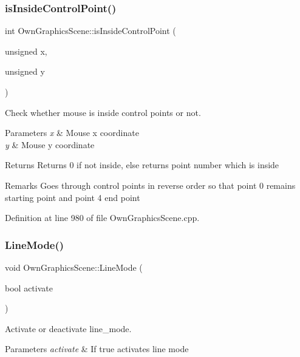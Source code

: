 \subsubsection{\texorpdfstring{is\+Inside\+Control\+Point()}{isInsideControlPoint()}}
{\footnotesize\ttfamily int Own\+Graphics\+Scene\+::is\+Inside\+Control\+Point (\begin{DoxyParamCaption}\item[{unsigned}]{x,  }\item[{unsigned}]{y }\end{DoxyParamCaption})}



Check whether mouse is inside control points or not. 


\begin{DoxyParams}{Parameters}
{\em x} & Mouse x coordinate \\
\hline
{\em y} & Mouse y coordinate \\
\hline
\end{DoxyParams}
\begin{DoxyReturn}{Returns}
Returns 0 if not inside, else returns point number which is inside 
\end{DoxyReturn}
\begin{DoxyRemark}{Remarks}
Goes through control points in reverse order so that point 0 remains starting point and point 4 end point 
\end{DoxyRemark}


Definition at line 980 of file Own\+Graphics\+Scene.\+cpp.

\mbox{\label{classOwnGraphicsScene_a6b7e69131827f0ae64626af378ff9974}} 
\subsubsection{\texorpdfstring{Line\+Mode()}{LineMode()}}
{\footnotesize\ttfamily void Own\+Graphics\+Scene\+::\+Line\+Mode (\begin{DoxyParamCaption}\item[{bool}]{activate }\end{DoxyParamCaption})}



Activate or deactivate line\+\_\+mode. 


\begin{DoxyParams}{Parameters}
{\em activate} & If true activates line mode \\
\hline
\end{DoxyParams}



